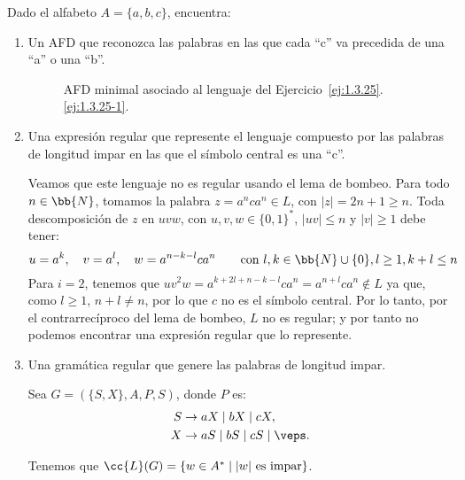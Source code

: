 \begin{ejercicio}\label{ej:1.3.25}
    Dado el alfabeto $A=\{a,b,c\}$, encuentra:
    \begin{enumerate}
        \item \label{ej:1.3.25-1}
        Un AFD que reconozca las palabras en las que cada ``c'' va precedida de una ``a'' o una ``b''.
        \begin{figure}
            \centering
            \caption{AFD minimal asociado al lenguaje del Ejercicio~\ref{ej:1.3.25}.\ref{ej:1.3.25-1}.}
            \label{fig:1.3.25-1}
        \end{figure}

        \item Una expresión regular que represente el lenguaje compuesto por las palabras de longitud impar en las que el símbolo central es una ``c''.
        
        Veamos que este lenguaje no es regular usando el lema de bombeo. Para todo $n\in\bb{N}$, tomamos la palabra $z=a^nca^n\in L$, con $|z|=2n+1\geq n$. Toda descomposición de $z$ en $uvw$, con $u,v,w\in \{0,1\}^*$, $|uv|\leq n$ y $|v|\geq 1$ debe tener:
        \begin{equation*}
            u=a^k, \quad v=a^l, \quad w=a^{n-k-l}ca^n\qquad \text{con } l,k\in \bb{N}\cup \{0\}, l\geq 1, k+l\leq n
        \end{equation*}
        Para $i=2$, tenemos que $uv^2w=a^{k+2l+n-k-l}ca^n=a^{n+l}ca^n\notin L$ ya que, como $l\geq 1$, $n+l\neq n$, por lo que $c$ no es el símbolo central. Por lo tanto, por el contrarrecíproco del lema de bombeo, $L$ no es regular; y por tanto no podemos encontrar una expresión regular que lo represente.

        \item Una gramática regular que genere las palabras de longitud impar.
        
        Sea $G=(\{S,X\}, A, P, S)$, donde $P$ es:
        \begin{align*}
            S &\to aX \mid bX \mid cX, \\
            X &\to aS \mid bS \mid cS \mid \veps.
        \end{align*}

        Tenemos que $\cc{L}(G)=\{w\in A^* \mid |w|\text{ es impar}\}$.
    \end{enumerate}
\end{ejercicio}

